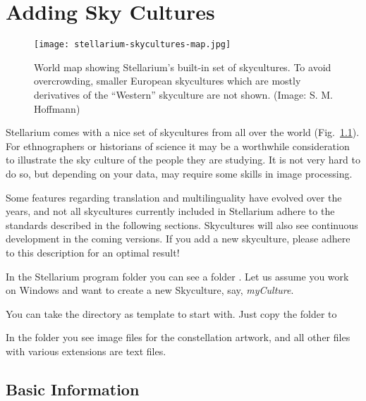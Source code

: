 

\chapter{Adding Sky Cultures}
\label{ch:SkyCultures}

\begin{figure}[th]\centering
\texttt{[image: stellarium-skycultures-map.jpg]}
\caption{World map showing Stellarium's built-in set of
  skycultures. To avoid overcrowding, smaller European skycultures
  which are mostly derivatives of the ``Western'' skyculture are not
  shown. (Image: S. M. Hoffmann)}
\label{fig:skycultures}
\end{figure}


\noindent Stellarium comes with a nice set of skycultures from all
over the world (Fig.~\ref{fig:skycultures}). For ethnographers or
historians of science it may be a worthwhile consideration to
illustrate the sky culture of the people they are studying. It is not
very hard to do so, but depending on your data, may require some
skills in image processing.

Some features regarding translation and multilinguality have evolved
over the years, and not all skycultures currently included in
Stellarium adhere to the standards described in the following
sections. Skycultures will also see continuous development in the
coming versions. If you add a new skyculture, please adhere to this
description for an optimal result!


In the Stellarium program folder you can see a folder
. Let us assume you work on Windows and want to create a
new Skyculture, say, \emph{myCulture}.

You can take the  directory as template to start with. Just copy the folder 
 to

In the folder you see image files for the constellation artwork, and all
other files with various extensions are text files. 


\section{Basic Information}
\label{sec:skycultures:info.ini}



